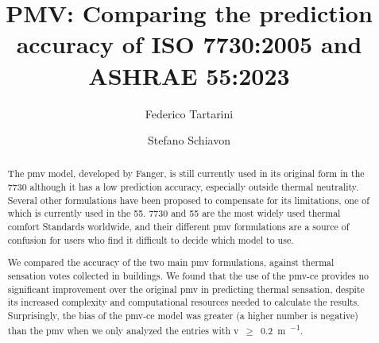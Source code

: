 \begin{frontmatter}

    \title{PMV: Comparing the prediction accuracy of ISO 7730:2005 and ASHRAE 55:2023}

    \author[label1,label2]{Federico Tartarini}
    \author[label3]{Stefano Schiavon}

    \address[label1]{Berkeley Education Alliance for Research in Singapore, Singapore}
    \address[label2]{Heat and Health Research Incubator, Faculty of Health and Medicine, University of Sydney, Sydney, AU}
    \address[label3]{Center for the Built Environment, University of California, Berkeley, CA, USA}


    \begin{abstract}

        The \ac{pmv} model, developed by Fanger, is still currently used in its original form in the \gls{7730} although it has a low prediction accuracy, especially outside thermal neutrality.
        Several other formulations have been proposed to compensate for its limitations, one of which is currently used in the \gls{55}.
        \gls{7730} and \gls{55} are the most widely used thermal comfort Standards worldwide, and their different \ac{pmv} formulations are a source of confusion for users who find it difficult to decide which model to use.

        We compared the accuracy of the two main \ac{pmv} formulations, against  thermal sensation votes collected in buildings.
        We found that the use of the \ac{pmv-ce} provides no significant improvement over the original \ac{pmv} in predicting thermal sensation, despite its increased complexity and computational resources needed to calculate the results.
        Surprisingly, the bias of the \ac{pmv-ce} model was greater (a higher number is negative) than the \ac{pmv} when we only analyzed the entries with \ac{v}~$\geq$~\qty{0.2}{\m\per\sec}.


\end{abstract}
\end{frontmatter}

